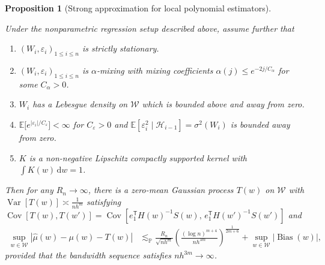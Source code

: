 \documentclass[11pt,lof]{puthesis}
\renewcommand{\P}{\ensuremath{\mathbb{P}}}
\newcommand{\E}{\ensuremath{\mathbb{E}}}
\newcommand{\cH}{\ensuremath{\mathcal{H}}}
\newcommand{\cW}{\ensuremath{\mathcal{W}}}
\newcommand{\T}{\ensuremath{\mathsf{T}}}
\DeclareMathOperator{\Var}{Var}
\DeclareMathOperator{\Cov}{Cov}
\DeclareMathOperator{\Bias}{Bias}
\newcommand{\diff}[1]{\,\mathrm{d}#1}
\theoremstyle{break}
\newtheorem{proposition}{Proposition}[section]
\theoremstyle{proof}
\begin{document}
\begin{proposition}[Strong approximation for local polynomial estimators]%
  \label{pro:yurinskii_local_poly}

  Under the nonparametric regression setup described above,
  assume further that
  \begin{enumerate}[label=(\roman*)]

    \item
      $(W_i, \varepsilon_i)_{1 \leq i \leq n}$
      is strictly stationary.

    \item
      $(W_i, \varepsilon_i)_{1 \leq i \leq n}$
      is $\alpha$-mixing with mixing coefficients
      $\alpha(j) \leq e^{-2 j / C_\alpha}$
      for some $C_\alpha > 0$.

    \item
      $W_i$ has a Lebesgue density on $\cW$
      which is bounded above and away from zero.

    \item
      $\E\big[e^{|\varepsilon_i|/C_\varepsilon}\big] < \infty$
      for $C_\varepsilon > 0$ and
      $\E\left[\varepsilon^2_i \mid \cH_{i-1}\right]=\sigma^2(W_i)$
      is bounded away from zero.

    \item
      $K$ is a non-negative Lipschitz
      compactly supported kernel with
      $\int K(w) \diff{w} = 1$.

  \end{enumerate}
  Then for any $R_n \to \infty$,
  there is a zero-mean Gaussian process
  $T(w)$ on $\cW$
  with $\Var[T(w)] \asymp\frac{1}{n h^m}$
  satisfying
  $\Cov[T(w), T(w')]
  = \Cov[e_1^\T H(w)^{-1} S(w),\, e_1^\T H(w')^{-1} S(w')]$
  and
  \begin{align*}
    \sup_{w \in \cW}
    \left|\hat \mu(w) - \mu(w) - T(w) \right|
    &\lesssim_\P
    \frac{R_n}{\sqrt{n h^m}}
    \left(
      \frac{(\log n)^{m+4}}{n h^{3m}}
    \right)^{\frac{1}{2m+6}}
    + \sup_{w \in \cW} |\Bias(w)|,
  \end{align*}
  provided that the bandwidth sequence satisfies
  $n h^{3m} \to \infty$.
\end{proposition}
\end{document}
